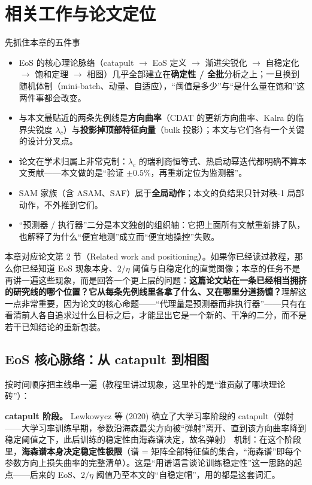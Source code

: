 \section{相关工作与论文定位}
\label{sec:ch02}

\begin{keybox}{先抓住本章的五件事}
\begin{itemize}
  \item EoS 的核心理论脉络（catapult $\to$ EoS 定义 $\to$ 渐进尖锐化 $\to$ 自稳定化 $\to$ 饱和定理 $\to$ 相图）几乎全部建立在\textbf{确定性 / 全批}分析之上；一旦换到随机体制（mini-batch、动量、自适应），“阈值是多少”与“是什么量在饱和”这两件事都会改变。
  \item 与本文最贴近的两条先例线是\textbf{方向曲率}（CDAT 的更新方向曲率、Kalra 的临界尖锐度 $\lambda_c$）与\textbf{投影掉顶部特征向量}（bulk 投影）；本文与它们各有一个关键的设计分叉点。
  \item 论文在学术归属上非常克制：$\lambda_c$ 的瑞利商恒等式、热启动幂迭代都明确\textbf{不}算本文贡献——本文做的是“验证 $\pm0.5\%$，再重新定位为监测器”。
  \item SAM 家族（含 ASAM、SAF）属于\textbf{全局动作}；本文的负结果只针对秩-1 局部动作，不外推到它们。
  \item “预测器 / 执行器”二分是本文独创的组织轴：它把上面所有文献重新排了队，也解释了为什么“便宜地测”成立而“便宜地操控”失败。
\end{itemize}
\end{keybox}

\noindent 本章对应论文第 2 节（Related work and
positioning）。如果你已经读过教程，那么你已经知道 EoS 现象本身、$2/\eta$
阈值与自稳定化的直觉图像；本章的任务不是再讲一遍这些现象，而是回答一个更上层的问题：\textbf{这篇论文站在一条已经相当拥挤的研究线的哪个位置？它从每条先例线里各拿了什么、又在哪里分道扬镳？}理解这一点非常重要，因为论文的核心命题——“代理量是预测器而非执行器”——只有在看清前人各自追求过什么目标之后，才能显出它是一个新的、干净的二分，而不是若干已知结论的重新包装。

\subsection{EoS 核心脉络：从 catapult 到相图}
\label{sec:ch02-core}

按时间顺序把主线串一遍（教程里讲过现象，这里补的是“谁贡献了哪块理论砖”）：

\textbf{catapult 阶段。} Lewkowycz 等 (2020) 确立了大学习率阶段的 catapult（弹射——大学习率训练早期，参数沿海森最尖方向被“弹射”离开、直到该方向曲率降到稳定阈值之下，此后训练的稳定性由海森谱决定，故名弹射）
机制：在这个阶段里，\textbf{海森谱本身决定稳定性极限}（谱 = 矩阵全部特征值的集合，“海森谱”即每个参数方向上损失曲率的完整清单）。这是“用谱语言谈论训练稳定性”这一思路的起点——后来的
EoS、$2/\eta$ 阈值乃至本文的“自稳定帽”，用的都是这套词汇。

